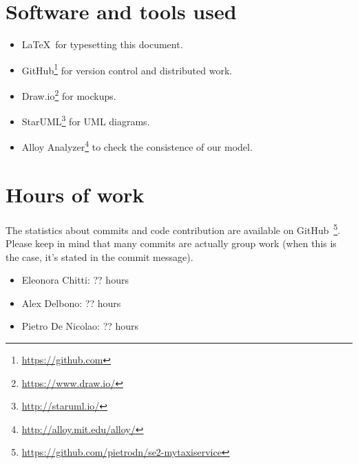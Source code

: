 \section{Software and tools used}
\begin{itemize}
    \item \LaTeX\, for typesetting this document.
    \item GitHub\footnote{\url{https://github.com}} for version control and distributed work.
    \item Draw.io\footnote{\url{https://www.draw.io/}} for mockups.
    \item StarUML\footnote{\url{http://staruml.io/}} for UML diagrams.
    \item Alloy Analyzer\footnote{\url{http://alloy.mit.edu/alloy/}} to check the consistence of our model.
\end{itemize}

\section{Hours of work}
The statistics about commits and code contribution are available on GitHub~\footnote{\url{https://github.com/pietrodn/se2-mytaxiservice}}.
Please keep in mind that many commits are actually group work (when this is the case, it's stated in the commit message).

\begin{itemize}
    \item Eleonora Chitti: ?? hours
    \item Alex Delbono: ?? hours
    \item Pietro De Nicolao: ?? hours
\end{itemize}
